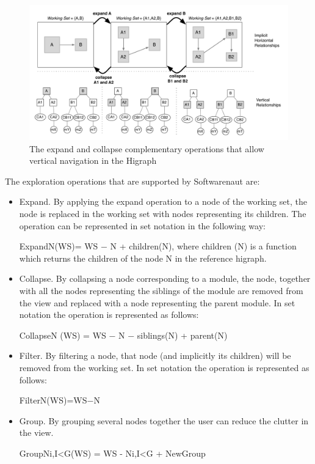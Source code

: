 \documentclass[preprint,12pt]{elsarticle}
\begin{document}
\begin{figure}[b!]
\begin{center}
\includegraphics[width=\linewidth]{images/SnautSequence}
\caption{The expand and collapse complementary operations that allow vertical navigation in the Higraph}
\label{}
\end{center}
\end{figure}

The exploration operations that are supported by Softwarenaut are:

\begin{itemize}

\item Expand. By applying the expand operation to a node of the working set, the node is replaced in the working set with nodes representing its children. The operation can be represented in set notation in the following way:

ExpandN(WS)= WS − N + children(N), where children (N) is a function 	which returns the children of the node N in the reference higraph.

\item Collapse. By collapsing a node corresponding to a module, the node, together with all the nodes representing the siblings of the module are removed from the view and replaced with a node representing the parent module. In set notation the operation is represented as follows:

CollapseN (WS) = WS − N − siblings(N) + parent(N)

\item Filter.
By filtering a node, that node (and implicitly its children) will be removed from the working set. In set notation the operation is represented as follows:

FilterN(WS)=WS−N


\item Group.
By grouping several nodes together the user can reduce the clutter in the view. 

GroupNi,I<G(WS) = WS - Ni,I<G + NewGroup


\end{itemize}
\end{document}
